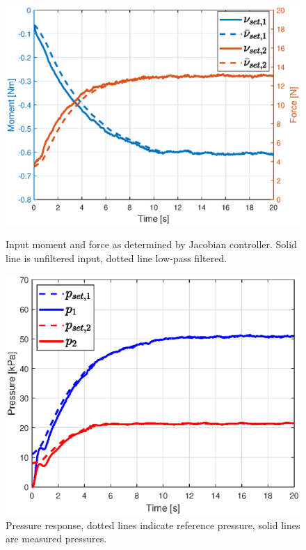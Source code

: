 \begin{figure}[H] 
    \begin{minipage}[b]{0.49\linewidth}
     \centering
    \includegraphics[width=\linewidth]{Figures/Chapter5/jacinputstepleft.eps} 
    \caption{Input moment and force as determined by Jacobian controller. Solid line is unfiltered input, dotted line low-pass filtered. } 
    \label{fig5:nuleft} 
       \end{minipage} 
    \begin{minipage}[b]{0.49\linewidth}
     \centering
    \includegraphics[width=\linewidth]{Figures/Chapter5/pressurestepleft.eps} 
    \caption{Pressure response, dotted lines indicate reference pressure, solid lines are measured pressures.} 
    \label{fig5:pleft} 
    \end{minipage} 
\end{figure}


